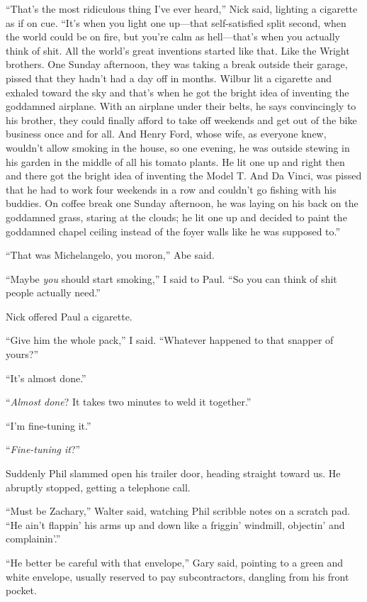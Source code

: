 ``That's the most ridiculous thing I've ever heard,'' Nick said,
lighting a cigarette as if on cue. ``It's when you light one up---that
self-satisfied split second, when the world could be on fire, but you're
calm as hell---that's when you actually think of shit. All the world's
great inventions started like that. Like the Wright brothers. One Sunday
afternoon, they was taking a break outside their garage, pissed that
they hadn't had a day off in months. Wilbur lit a cigarette and exhaled
toward the sky and that's when he got the bright idea of inventing the
goddamned airplane. With an airplane under their belts, he says
convincingly to his brother, they could finally afford to take off
weekends and get out of the bike business once and for all. And Henry
Ford, whose wife, as everyone knew, wouldn't allow smoking in the house,
so one evening, he was outside stewing in his garden in the middle of
all his tomato plants. He lit one up and right then and there got the
bright idea of inventing the Model T. And Da Vinci, was pissed that he
had to work four weekends in a row and couldn't go fishing with his
buddies. On coffee break one Sunday afternoon, he was laying on his back
on the goddamned grass, staring at the clouds; he lit one up and decided
to paint the goddamned chapel ceiling instead of the foyer walls like he
was supposed to.''

``That was Michelangelo, you moron,'' Abe said.

``Maybe \emph{you} should start smoking,'' I said to Paul. ``So you can
think of shit people actually need.''

Nick offered Paul a cigarette.

``Give him the whole pack,'' I said. ``Whatever happened to that snapper
of yours?''

``It's almost done.''

``\emph{Almost done}? It takes two minutes to weld it together.''

``I'm fine-tuning it.''

``\emph{Fine-tuning it}?''

Suddenly Phil slammed open his trailer door, heading straight toward us.
He abruptly stopped, getting a telephone call.

``Must be Zachary,'' Walter said, watching Phil scribble notes on a
scratch pad. ``He ain't flappin' his arms up and down like a friggin'
windmill, objectin' and complainin'.''

``He better be careful with that envelope,'' Gary said, pointing to a
green and white envelope, usually reserved to pay subcontractors,
dangling from his front pocket.

